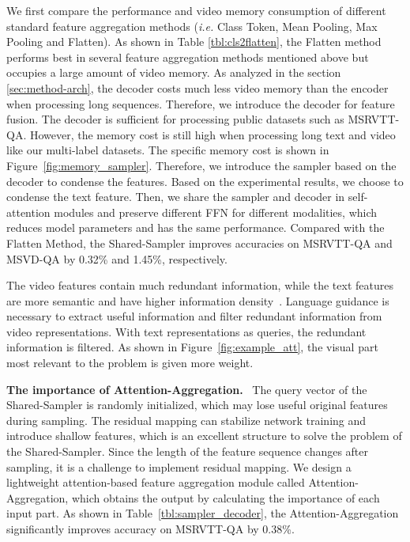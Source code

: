 \documentclass[10pt,twocolumn,letterpaper]{article}
\begin{document}
We first compare the performance and video memory consumption of different standard feature aggregation methods (\textit{i.e.} Class Token, Mean Pooling, Max Pooling and Flatten). 
As shown in Table \ref{tbl:cls2flatten}, the Flatten method performs best in several feature aggregation methods mentioned above but occupies a large amount of video memory. 
As analyzed in the section \ref{sec:method-arch}, the decoder costs much less video memory than the encoder when processing long sequences. 
Therefore, we introduce the decoder for feature fusion. 
The decoder is sufficient for processing public datasets such as MSRVTT-QA. 
However, the memory cost is still high when processing long text and video like our multi-label datasets. 
The specific memory cost is shown in Figure~\ref{fig:memory_sampler}. 
Therefore, we introduce the sampler based on the decoder to condense the features. Based on the experimental results, we choose to condense the text feature. 
Then, we share the sampler and decoder in self-attention modules and preserve different FFN for different modalities, which reduces model parameters and has the same performance. 
Compared with the Flatten Method, the Shared-Sampler improves accuracies on MSRVTT-QA and MSVD-QA by 0.32\% and 1.45\%, respectively.


The video features contain much redundant information, while the text features are more semantic and have higher information density~\cite{He2022MaskedAA}. 
Language guidance is necessary to extract useful information and filter redundant information from video representations. 
With text representations as queries, the redundant information is filtered. As shown in Figure~\ref{fig:example_att}, the visual part most relevant to the problem is given more weight.


\textbf{The importance of Attention-Aggregation.}~
The query vector of the Shared-Sampler is randomly initialized, which may lose useful original features during sampling. 
The residual mapping can stabilize network training and introduce shallow features, which is an excellent structure to solve the problem of the Shared-Sampler.
Since the length of the feature sequence changes after sampling, it is a challenge to implement residual mapping. 
We design a lightweight attention-based feature aggregation module called Attention-Aggregation, which obtains the output by calculating the importance of each input part. 
As shown in Table~\ref{tbl:sampler_decoder}, the Attention-Aggregation significantly improves accuracy on MSRVTT-QA by 0.38\%.
\end{document}
